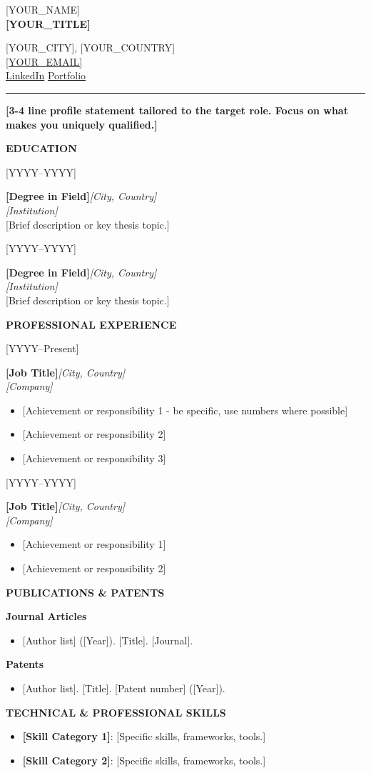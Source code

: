 \documentclass[10pt,a4paper]{article}
\newcommand{\cvheader}[7]{%
  \noindent
  \begin{minipage}[t]{0.62\linewidth}
    {\latoblack\fontsize{28}{30}\selectfont\color{cvblue}#1}\\[3pt]
    {\bfseries\large #2}
  \end{minipage}%
  \hfill
  \begin{minipage}[t]{0.36\linewidth}
    \raggedleft\small
    #3\\
    #4 \quad\textbullet\quad \href{mailto:#5}{#5}\\
    #6 \quad #7
  \end{minipage}\par
  \vspace{6pt}
  {\color{cvblue}\rule{\linewidth}{1.1pt}}
  \vspace{8pt}
}
\newcommand{\cvprofile}[1]{{\bfseries\color{cvgray} #1}\par\vspace{10pt}}
\newenvironment{cvsection}[1]{%
  \noindent
  \begin{minipage}[t]{0.16\linewidth}
    \bfseries\MakeUppercase{#1}
  \end{minipage}%
  \hspace{0.02\linewidth}%
  \begin{minipage}[t]{0.80\linewidth}
}{%
  \end{minipage}\par\vspace{10pt}
}
\newcommand{\cvdate}[5]{%
  \noindent
  \begin{minipage}[t]{0.22\linewidth}
    \small #1
  \end{minipage}%
  \hspace{0.02\linewidth}%
  \begin{minipage}[t]{0.76\linewidth}
    \textbf{#2}\hfill{\itshape #4}\\
    {\itshape #3}\\[2pt]
    #5
  \end{minipage}\par\vspace{7pt}
}
\newcommand{\cvblock}[1]{\noindent#1\par\vspace{4pt}}
\newenvironment{cvitemize}{%
  \begin{itemize}[leftmargin=1.1em, itemsep=1pt, topsep=0pt, partopsep=0pt, parsep=0pt, before=\vspace{-4pt}]
}{%
  \end{itemize}
}
\begin{document}
\cvheader{[YOUR_NAME]}{[YOUR_TITLE]}{[YOUR_CITY], [YOUR_COUNTRY]}{[YOUR_PHONE]}{[YOUR_EMAIL]}{\href{[YOUR_LINKEDIN_URL]}{LinkedIn}}{\href{[YOUR_PORTFOLIO_URL]}{Portfolio}}

\cvprofile{[3-4 line profile statement tailored to the target role. Focus on what makes you uniquely qualified.]}

\begin{cvsection}{Education}
\cvdate{[YYYY--YYYY]}{[Degree in Field]}{[Institution]}{[City, Country]}{[Brief description or key thesis topic.]}
\cvdate{[YYYY--YYYY]}{[Degree in Field]}{[Institution]}{[City, Country]}{[Brief description or key thesis topic.]}
\end{cvsection}

\begin{cvsection}{Professional Experience}
\cvdate{[YYYY--Present]}{[Job Title]}{[Company]}{[City, Country]}{%
\begin{cvitemize}
\item{}[Achievement or responsibility 1 - be specific, use numbers where possible]
\item{}[Achievement or responsibility 2]
\item{}[Achievement or responsibility 3]
\end{cvitemize}}
\cvdate{[YYYY--YYYY]}{[Job Title]}{[Company]}{[City, Country]}{%
\begin{cvitemize}
\item{}[Achievement or responsibility 1]
\item{}[Achievement or responsibility 2]
\end{cvitemize}}
\end{cvsection}

\begin{cvsection}{Publications \& Patents}
\cvblock{\textbf{Journal Articles}
\begin{cvitemize}
\item{}[Author list] ([Year]). [Title]. [Journal].
\end{cvitemize}}
\cvblock{\textbf{Patents}
\begin{cvitemize}
\item{}[Author list]. [Title]. [Patent number] ([Year]).
\end{cvitemize}}
\end{cvsection}

\begin{cvsection}{Technical \& Professional Skills}
\cvblock{%
\begin{cvitemize}
\item \textbf{[Skill Category 1]}: [Specific skills, frameworks, tools.]
\item \textbf{[Skill Category 2]}: [Specific skills, frameworks, tools.]
\end{cvitemize}}
\end{cvsection}
\end{document}
